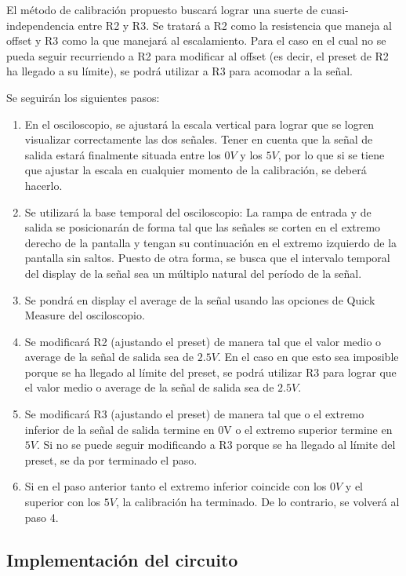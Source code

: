 \documentclass[../../main.tex]{subfiles}
\begin{document}
El método de calibración propuesto buscará lograr una suerte de cuasi-independencia entre R2 y R3. Se tratará a R2 como la resistencia que maneja al offset y R3 como la que manejará al escalamiento. Para el caso en el cual no se pueda seguir recurriendo a R2 para modificar al offset (es decir, el preset de R2 ha llegado a su límite), se podrá utilizar a R3 para acomodar a la señal. \par
Se seguirán los siguientes pasos:
\begin{enumerate}
	\item En el osciloscopio, se ajustará la escala vertical para lograr que se logren visualizar correctamente las dos señales. Tener en cuenta que la señal de salida estará finalmente situada entre los $0V$ y los $5V$, por lo que si se tiene que ajustar la escala en cualquier momento de la calibración, se deberá hacerlo.
	\item Se utilizará la base temporal del osciloscopio: La rampa de entrada y de salida se posicionarán de forma tal que las señales se corten en el extremo derecho de la pantalla y tengan su continuación en el extremo izquierdo de la pantalla sin saltos. Puesto de otra forma, se busca que el intervalo temporal del display de la señal sea un múltiplo natural del período de la señal. 
	\item Se pondrá en display el average de la señal usando las opciones de Quick Measure del osciloscopio. 
	\item Se modificará R2 (ajustando el preset) de manera tal que el valor medio o average de la señal de salida sea de $2.5V$. En el caso en que esto sea imposible porque se ha llegado al límite del preset, se podrá utilizar R3 para lograr que el valor medio o average de la señal de salida sea de $2.5V$.
	\item Se modificará R3 (ajustando el preset) de manera tal que o el extremo inferior de la señal de salida termine en 0V o el extremo superior termine en $5V$. Si no se puede seguir modificando a R3 porque se ha llegado al límite del preset, se da por terminado el paso.
	\item Si en el paso anterior tanto el extremo inferior coincide con los $0V$ y el superior con los $5V$, la calibración ha terminado. De lo contrario, se volverá al paso 4. 
	
\end{enumerate}

\subsection{Implementación del circuito}
\end{document}
